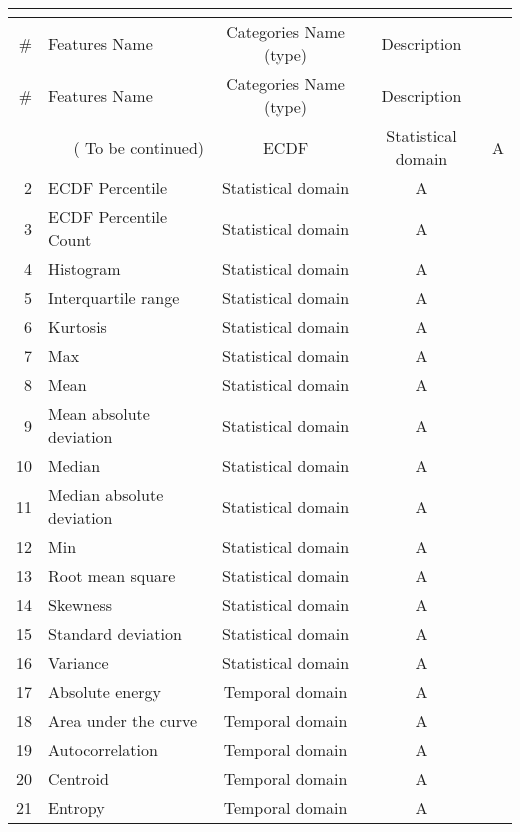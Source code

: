 \begin{tabularx}{\linewidth}{@{}rlcc@{}}
\caption{My caption} \\
\label{tab:Features_list}\\

\toprule
  \#  &  Features Name & Categories Name (type) & Description\\
\midrule
\endfirsthead
\toprule
  \#  &  Features Name & Categories Name (type) & Description\\
\midrule
\endhead
\midrule
\multicolumn{2}{r}{\footnotesize( To be continued)}
\endfoot
\bottomrule
\endlastfoot

  1 & ECDF              & Statistical domain & A\\
  2 & ECDF Percentile      & Statistical domain & A         \\
  3 & ECDF Percentile Count & Statistical domain & A\\
  4 & Histogram    & Statistical domain & A \\
  5 & Interquartile range               & Statistical domain & A \\
  6 & Kurtosis                   & Statistical domain & A \\
  7 & Max         & Statistical domain & A \\
  8 & Mean         & Statistical domain  & A\\
  9 & Mean absolute deviation         & Statistical domain  & A\\
  10 & Median         & Statistical domain  & A\\
  11 & Median absolute deviation         & Statistical domain  & A\\
  12 & Min         & Statistical domain  & A\\
  13 & Root mean square         & Statistical domain  & A\\
  14 & Skewness         & Statistical domain  & A\\
  15 & Standard deviation         & Statistical domain  & A\\
  16 & Variance         & Statistical domain  & A\\
  17 & Absolute energy         & Temporal domain  & A\\
  18 & Area under the curve         & Temporal domain  & A\\
  19 & Autocorrelation         & Temporal domain  & A\\
  20 & Centroid         & Temporal domain  & A\\
  21 & Entropy         & Temporal domain  & A\\

\end{tabularx}
